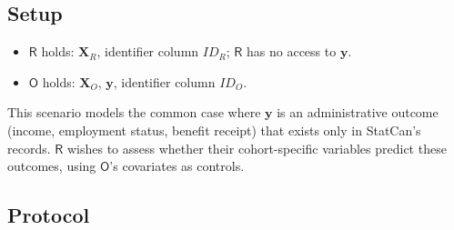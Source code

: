 \documentclass[12pt]{article}
\theoremstyle{definition}
\theoremstyle{plain}
\newcommand{\bXR}{\mathbf{X}_{R}}
\newcommand{\bXO}{\mathbf{X}_{O}}
\newcommand{\by}{\mathbf{y}}
\newcommand{\Party}[1]{\textsf{#1}}
\begin{document}
\subsection{Setup}

\begin{itemize}[noitemsep]
  \item $\Party{R}$ holds: $\bXR$, identifier column $\mathit{ID}_{R}$; $\Party{R}$ has no access to $\by$.
  \item $\Party{O}$ holds: $\bXO$, $\by$, identifier column $\mathit{ID}_{O}$.
\end{itemize}

This scenario models the common case where $\by$ is an administrative outcome (income, employment status, benefit receipt) that exists only in StatCan's records. $\Party{R}$ wishes to assess whether their cohort-specific variables predict these outcomes, using $\Party{O}$'s covariates as controls.

\subsection{Protocol}
\end{document}
